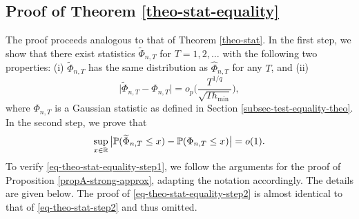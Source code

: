 \subsection*{Proof of Theorem \ref{theo-stat-equality}}


The proof proceeds analogous to that of Theorem \ref{theo-stat}. In the first step, we show that there exist statistics $\widetilde{\Phi}_{n,T}$ for $T = 1,2,\ldots$ with the following two properties: (i) $\widetilde{\Phi}_{n,T}$ has the same distribution as $\widehat{\Phi}_{n,T}$ for any $T$, and (ii)
\begin{equation}\label{eq-theo-stat-equality-step1}
\big| \widetilde{\Phi}_{n,T} - \Phi_{n,T} \big| = o_p \Big( \frac{T^{1/q}}{\sqrt{T h_{\min}}} \Big), 
\end{equation}
where $\Phi_{n,T}$ is a Gaussian statistic as defined in Section \ref{subsec-test-equality-theo}. In the second step, we prove that 
\begin{equation}\label{eq-theo-stat-equality-step2}
\sup_{x \in \mathbb{R}} \big| \mathbb{P}(\widetilde{\Phi}_{n,T} \le x) - \mathbb{P}(\Phi_{n,T} \le x) \big| = o(1). 
\end{equation}
To verify \eqref{eq-theo-stat-equality-step1}, we follow the arguments for the proof of Proposition \ref{propA-strong-approx}, adapting the notation accordingly. The details are given below. The proof of \eqref{eq-theo-stat-equality-step2} is almost identical to that of \eqref{eq-theo-stat-step2} and thus omitted. 


